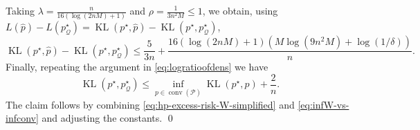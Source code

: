 \documentclass[11pt]{article}
\renewcommand{\le}{\leqslant}
\newcommand{\Qs}{\mathcal{Q}}
\newcommand{\conv}{\mathop{\mathrm{conv}}}
\newcommand{\kl}{\operatorname{KL}}
\theoremstyle{definition}
\theoremstyle{remark}
\begin{document}
Taking $\lambda=\frac{n}{16(\log(2nM)+1)}$ and $\rho = \frac{1}{3n^2M} \le 1$, we obtain, using $L(\widehat p)-L(p^\star_{\Qs})
=\kl(p^\star,\widehat p)-\kl(p^\star,p^\star_{\Qs})$,
\begin{equation}\label{eq:hp-excess-risk-W-simplified}
\kl(p^\star,\widehat p)-\kl(p^\star,p^\star_{\Qs})
\le
\frac{5}{3n} + \frac{16(\log(2nM)+1)(M\log(9n^2M)+\log(1/\delta))}{n}.
\end{equation}
Finally, repeating the argument in \eqref{eq:logratioofdens} we have
\begin{equation}\label{eq:infW-vs-infconv}
\kl(p^\star,p^\star_{\Qs})
\le
\inf_{p\in\conv(\mathcal P)}\kl(p^\star,p)+\frac{2}{n}.
\end{equation}
The claim follows by combining \eqref{eq:hp-excess-risk-W-simplified} and \eqref{eq:infW-vs-infconv} and adjusting the constants. \qed
\end{document}
